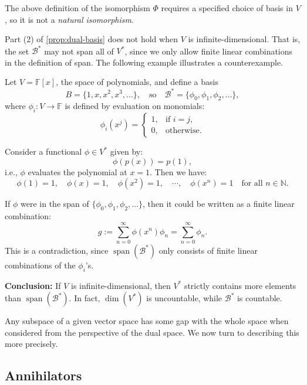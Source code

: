 \begin{remark}\label{rem: non-canonical-isomorphism}
The above definition of the isomorphism $\Phi$ requires a specified choice of basis in \( V \), so it is not a \emph{natural isomorphism}.
\end{remark}
\begin{remark}
Part (2) of \autoref{prop:dual-basis} does not hold when \( V \) is infinite-dimensional. That is, the set \( \mathcal{B}^* \) may not span all of \( V^* \), since we only allow finite linear combinations in the definition of span. The following example illustrates a counterexample.
\end{remark}

\begin{example}\label{ex:dual-nonfinite}
Let \( V = \mathbb{F}[x] \), the space of polynomials, and define a basis
\[
B = \{ 1, x, x^2, x^3, \dots \}, \quad \text{so} \quad \mathcal{B}^* = \{ \phi_0, \phi_1, \phi_2, \dots \},
\]
where \( \phi_i : V \to \mathbb{F} \) is defined by evaluation on monomials:
\[
\phi_i(x^j) = \begin{cases}
1, & \text{if } i = j, \\
0, & \text{otherwise}.
\end{cases}
\]

Consider a functional \( \phi \in V^* \) given by:
\[
\phi(p(x)) = p(1),
\]
i.e., \( \phi \) evaluates the polynomial at \( x = 1 \). Then we have:
\[
\phi(1) = 1, \quad \phi(x) = 1, \quad \phi(x^2) = 1, \quad \cdots, \quad \phi(x^n) = 1 \quad \text{for all } n \in \mathbb{N}.
\]

If \( \phi \) were in the span of \( \{ \phi_0, \phi_1, \phi_2, \dots \} \), then it could be written as a finite linear combination:
\[
g := \sum_{n=0}^{\infty} \phi(x^n)\phi_n = \sum_{n=0}^{\infty} \phi_n.
\]
This is a contradiction, since \( \operatorname{span}(\mathcal{B}^*) \) only consists of finite linear combinations of the \( \phi_i \)'s.

\textbf{Conclusion:} If \( V \) is infinite-dimensional, then \( V^* \) strictly contains more elements than \( \operatorname{span}(\mathcal{B}^*) \). In fact, \( \dim(V^*) \) is uncountable, while \( \mathcal{B}^* \) is countable.

Any subspace of a given vector space has some gap with the whole space when considered from the perspective of the dual space. We now turn to describing this more precisely.
\end{example}

\subsection{Annihilators}\label{sec:annihilators}

